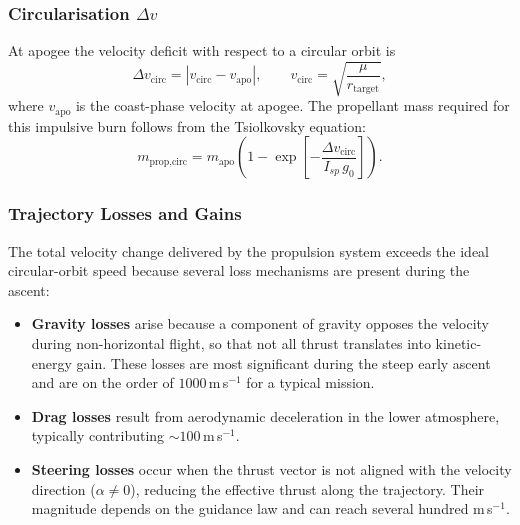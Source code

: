 \subsubsection{Circularisation \texorpdfstring{$\Delta v$}{Delta-v}}
\label{sssec:circ_dv}

At apogee the velocity deficit with respect to a circular orbit is
\begin{equation}
  \Delta v_{\text{circ}} = \left|v_{\text{circ}} - v_{\text{apo}}\right|,
  \qquad v_{\text{circ}} = \sqrt{\frac{\mu}{r_{\text{target}}}},
  \label{eq:dv_circ}
\end{equation}
where $v_{\text{apo}}$ is the coast-phase velocity at apogee.  The propellant
mass required for this impulsive burn follows from the Tsiolkovsky equation:
\begin{equation}
  m_{\text{prop,circ}} = m_{\text{apo}}\!\left(1 - \exp\!\left[
    -\frac{\Delta v_{\text{circ}}}{I_{sp}\,g_0}\right]\right).
  \label{eq:mprop_circ}
\end{equation}

\subsubsection{Trajectory Losses and Gains}
\label{sssec:losses_gains}

The total velocity change delivered by the propulsion system exceeds the ideal
circular-orbit speed because several loss mechanisms are present during the
ascent:

\begin{itemize}
  \item \textbf{Gravity losses} arise because a component of gravity opposes the
        velocity during non-horizontal flight, so that not all thrust translates
        into kinetic-energy gain. These losses are most significant during the
        steep early ascent and are on the order of
        $1000$\,m\,s$^{-1}$ for a typical mission.

  \item \textbf{Drag losses} result from aerodynamic deceleration in the
        lower atmosphere, typically contributing ${\sim}100$\,m\,s$^{-1}$.

  \item \textbf{Steering losses} occur when the thrust vector is not aligned
        with the velocity direction ($\alpha \neq 0$), reducing the effective
        thrust along the trajectory.  Their magnitude depends on the guidance
        law and can reach several hundred m\,s$^{-1}$.
\end{itemize}

